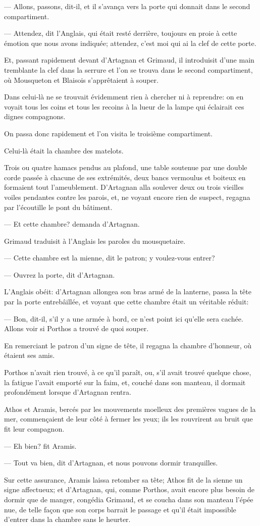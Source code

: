 — Allons, passons, dit-il, et il s'avança vers la porte qui donnait dans le second compartiment.

— Attendez, dit l'Anglais, qui était resté derrière, toujours en proie à cette émotion que nous avons indiquée; attendez, c'est moi qui ai la clef de cette porte.

Et, passant rapidement devant d'Artagnan et Grimaud, il introduisit d'une main tremblante la clef dans la serrure et l'on se trouva dans le second compartiment, où Mousqueton et Blaisois s'apprêtaient à souper.

Dans celui-là ne se trouvait évidemment rien à chercher ni à reprendre: on en voyait tous les coins et tous les recoins à la lueur de la lampe qui éclairait ces dignes compagnons.

On passa donc rapidement et l'on visita le troisième compartiment.

Celui-là était la chambre des matelots.

Trois ou quatre hamacs pendus au plafond, une table soutenue par une double corde passée à chacune de ses extrémités, deux bancs vermoulus et boiteux en formaient tout l'ameublement. D'Artagnan alla soulever deux ou trois vieilles voiles pendantes contre les parois, et, ne voyant encore rien de suspect, regagna par l'écoutille le pont du bâtiment.

— Et cette chambre? demanda d'Artagnan.

Grimaud traduisit à l'Anglais les paroles du mousquetaire.

— Cette chambre est la mienne, dit le patron; y voulez-vous entrer?

— Ouvrez la porte, dit d'Artagnan.

L'Anglais obéit: d'Artagnan allongea son bras armé de la lanterne, passa la tête par la porte entrebâillée, et voyant que cette chambre était un véritable réduit:

— Bon, dit-il, s'il y a une armée à bord, ce n'est point ici qu'elle sera cachée. Allons voir si Porthos a trouvé de quoi souper.

En remerciant le patron d'un signe de tête, il regagna la chambre d'honneur, où étaient ses amis.

Porthos n'avait rien trouvé, à ce qu'il paraît, ou, s'il avait trouvé quelque chose, la fatigue l'avait emporté sur la faim, et, couché dans son manteau, il dormait profondément lorsque d'Artagnan rentra.

Athos et Aramis, bercés par les mouvements moelleux des premières vagues de la mer, commençaient de leur côté à fermer les yeux; ils les rouvrirent au bruit que fit leur compagnon.

— Eh bien? fit Aramis.

— Tout va bien, dit d'Artagnan, et nous pouvons dormir tranquilles.

Sur cette assurance, Aramis laissa retomber sa tête; Athos fit de la sienne un signe affectueux; et d'Artagnan, qui, comme Porthos, avait encore plus besoin de dormir que de manger, congédia Grimaud, et se coucha dans son manteau l'épée nue, de telle façon que son corps barrait le passage et qu'il était impossible d'entrer dans la chambre sans le heurter.